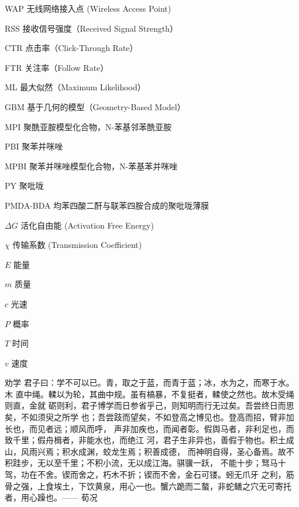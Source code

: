 \begin{denotation}[3cm]
\item[WAP] 无线网络接入点 (Wireless Access Point)
\item[RSS] 接收信号强度（Received Signal Strength）
\item[CTR] 点击率（Click-Through Rate）
\item[FTR] 关注率（Follow Rate）
\item[ML] 最大似然（Maximum Likelihood）
\item[GBM] 基于几何的模型（Geometry-Based Model）
\item[MPI] 聚酰亚胺模型化合物，N-苯基邻苯酰亚胺
\item[PBI] 聚苯并咪唑
\item[MPBI] 聚苯并咪唑模型化合物，N-苯基苯并咪唑
\item[PY] 聚吡咙
\item[PMDA-BDA]	均苯四酸二酐与联苯四胺合成的聚吡咙薄膜
\item[$\Delta G$] 活化自由能 (Activation Free Energy)
\item[$\chi$] 传输系数 (Transmission Coefficient)
\item[$E$] 能量
\item[$m$] 质量
\item[$c$] 光速
\item[$P$] 概率
\item[$T$] 时间
\item[$v$] 速度
\item[劝学] 君子曰：学不可以已。青，取之于蓝，而青于蓝；冰，水为之，而寒于水。木
  直中绳。輮以为轮，其曲中规。虽有槁暴，不复挺者，輮使之然也。故木受绳则直，金就
  砺则利，君子博学而日参省乎己，则知明而行无过矣。吾尝终日而思矣，不如须臾之所学
  也；吾尝跂而望矣，不如登高之博见也。登高而招，臂非加长也，而见者远；顺风而呼，
  声非加疾也，而闻者彰。假舆马者，非利足也，而致千里；假舟楫者，非能水也，而绝江
  河，君子生非异也，善假于物也。积土成山，风雨兴焉；积水成渊，蛟龙生焉；积善成德，
  而神明自得，圣心备焉。故不积跬步，无以至千里；不积小流，无以成江海。骐骥一跃，
  不能十步；驽马十驾，功在不舍。锲而舍之，朽木不折；锲而不舍，金石可镂。蚓无爪牙
  之利，筋骨之强，上食埃土，下饮黄泉，用心一也。蟹六跪而二螯，非蛇鳝之穴无可寄托
  者，用心躁也。—— 荀况
\end{denotation}
